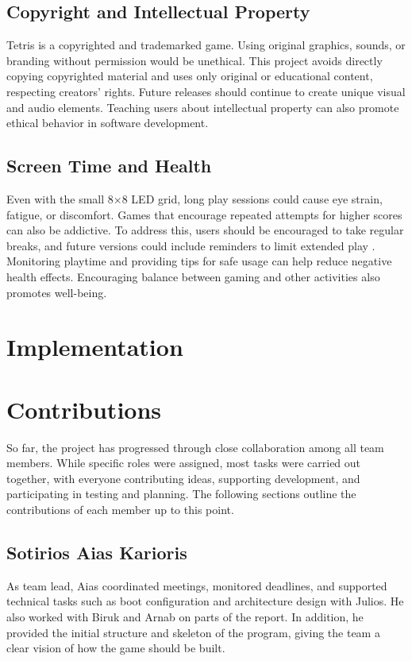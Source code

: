 \documentclass[11pt,titlepage,openright]{book}
\begin{document}
\section{Copyright and Intellectual Property}
Tetris is a copyrighted and trademarked game. Using original graphics, sounds, or branding without permission would be unethical. This project avoids directly copying copyrighted material and uses only original or educational content, respecting creators’ rights. Future releases should continue to create unique visual and audio elements. Teaching users about intellectual property can also promote ethical behavior in software development.

\section{Screen Time and Health}
Even with the small 8×8 LED grid, long play sessions could cause eye strain, fatigue, or discomfort. Games that encourage repeated attempts for higher scores can also be addictive. To address this, users should be encouraged to take regular breaks, and future versions could include reminders to limit extended play \cite{Ferguson2017}. Monitoring playtime and providing tips for safe usage can help reduce negative health effects. Encouraging balance between gaming and other activities also promotes well-being.

\chapter{Implementation}


\chapter{Contributions}
So far, the project has progressed through close collaboration among all team members. While specific roles were assigned, most tasks were carried out together, with everyone contributing ideas, supporting development, and participating in testing and planning. The following sections outline the contributions of each member up to this point.
\section{Sotirios Aias Karioris}
As team lead, Aias coordinated meetings, monitored deadlines, and supported technical tasks such as boot configuration and architecture design with Julios. He also worked with Biruk and Arnab on parts of the report. In addition, he provided the initial structure and skeleton of the program, giving the team a clear vision of how the game should be built.
\end{document}
